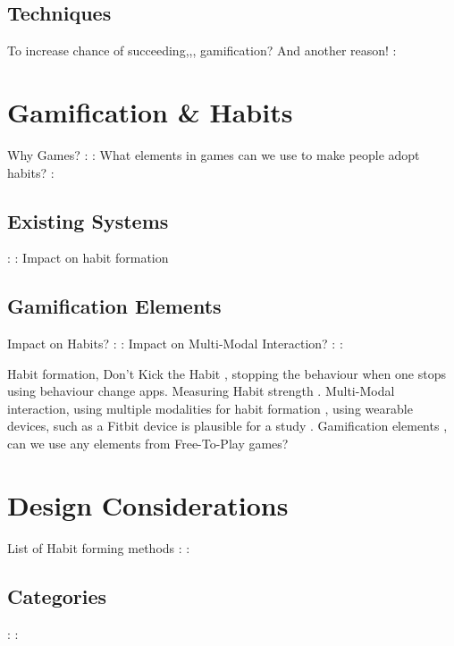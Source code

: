\subsection{Techniques}
To increase chance of succeeding,,, gamification? And another reason!
:\newline

\newpage

\section{Gamification \& Habits}
Why Games?
:\newline
:\newline
What elements in games can we use to make people adopt habits?
:\newline
\subsection{Existing Systems}
:\newline
:\newline
Impact on habit formation

\subsection{Gamification Elements}
Impact on Habits?
:\newline
:\newline
Impact on Multi-Modal Interaction?
:\newline
:\newline

Habit formation, Don't Kick the Habit \cite{article_dont_kick_habit}, stopping the behaviour when one stops using behaviour change apps.\newline
Measuring Habit strength \cite{article_habit_strength} \cite{article_habit_measurement}.\newline
\newline
Multi-Modal interaction, using multiple modalities for habit formation \cite{}, using wearable devices, such as a Fitbit device is plausible for a study \cite{article_wearable_good}.\newline
\newline
Gamification elements \cite{f2p_games_how_to}, can we use any elements from Free-To-Play games?\newline
\newline



\newpage
\section{Design Considerations}
List of Habit forming methods
:\newline
:\newline
\subsection*{Categories}
:\newline
:\newline

